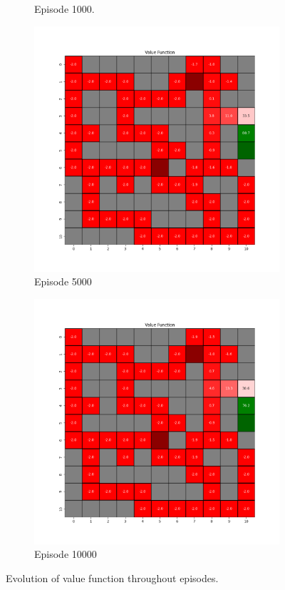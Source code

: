 \documentclass{assignment}
\begin{document}
\begin{figure}[H]
\begin{subfigure}{0.3\textwidth}
    \caption{Episode 1000.}
    \end{subfigure}\hfill
    \begin{subfigure}{0.3\textwidth}
        \includegraphics[width=\textwidth]{figures/value_q/gamma_sweep/value_function_alpha_0.1_gamma_0.5_epsilon_0.2_iteration_5000.png}
    \caption{Episode 5000}
    \end{subfigure}\hfill
    \begin{subfigure}{0.3\textwidth}
        \includegraphics[width=\textwidth]{figures/value_q/gamma_sweep/value_function_alpha_0.1_gamma_0.5_epsilon_0.2_iteration_10000.png}
    \caption{Episode 10000}
    \end{subfigure}
    \caption{Evolution of value function throughout episodes.}
    \label{fig:gamma_0.5_q_learning_value}
\end{figure}
\end{document}
